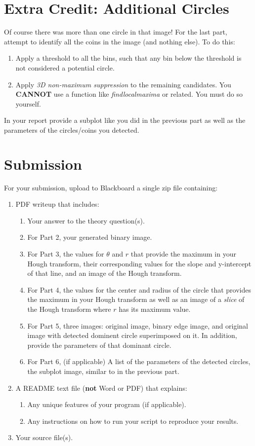 \documentclass[12pt]{article}
\begin{document}
\newpage
\section{Extra Credit:  Additional Circles}
Of course there was more than one circle in that image!  For the last part, attempt to identify all the coins in the image (and nothing else).  To do this:

\begin{enumerate}
\item Apply a threshold to all the bins, such that any bin below the threshold is not considered a potential circle.
\item Apply \emph{3D non-maximum suppression} to the remaining candidates.  You \textbf{CANNOT} use a function like \emph{findlocalmaxima} or related.  You must do so yourself.
\end{enumerate}


\noindent
In your report provide a subplot like you did in the previous part as well as the parameters of the circles/coins you detected. 


\newpage
\section*{Submission}
For your submission, upload to Blackboard a single zip file containing:

\begin{enumerate}
\item PDF writeup that includes:
\begin{enumerate}
\item Your answer to the theory question(s).
\item For Part 2, your generated binary image.
\item For Part 3, the values for $\theta$ and $r$ that provide the maximum in your Hough transform, their corresponding values for the slope and y-intercept of that line, and an image of the Hough transform.
\item For Part 4, the values for the center and radius of the circle that provides the maximum in your Hough transform as well as an image of a \emph{slice} of the Hough transform where $r$ has its maximum value.
\item For Part 5, three images:  original image, binary edge image, and original image with detected dominent circle superimposed on it.  In addition, provide the parameters of that dominant circle.
\item For Part 6, (if applicable) A list of the parameters of the detected circles, the subplot image, similar to in the previous part.
\end{enumerate}
\item A README text file (\textbf{not} Word or PDF) that explains:
\begin{enumerate}
\item Any unique features of your program (if applicable).
\item Any instructions on how to run your script to reproduce your results.
\end{enumerate}
\item Your source file(s).
\end{enumerate}
\clearpage
\end{document}
